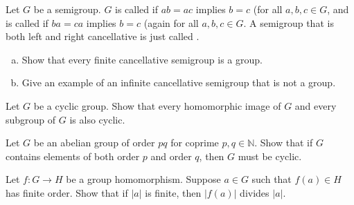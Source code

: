 \documentclass{problemset}
\begin{document}

\begin{exercise}
Let \(G\) be a semigroup. \(G\) is called  if \(ab=ac\) implies \(b=c\) (for all \(a,b,c \in G\), and is called  if \(ba=ca\) implies \(b=c\) (again for all \(a,b,c \in G\).  A semigroup that is both left and right cancellative is just called . 
\begin{enumerate}[(a)]
\item Show that every finite cancellative semigroup is a group.
\item Give an example of an infinite cancellative semigroup that is not a group.
\end{enumerate}
\end{exercise}


\begin{exercise}
Let \(G\) be a cyclic group. Show that every homomorphic image of \(G\) and every subgroup of \(G\) is also cyclic.
\end{exercise}


\begin{exercise}
Let \(G\) be an abelian group of order \(pq\) for coprime \(p,q\in \mathbb{N}\).  Show that if \(G\) contains elements of both order \(p\) and order \(q\), then \(G\) must be cyclic.
\end{exercise}


\begin{exercise}
Let \(f:G \rightarrow H\) be a group homomorphism.  Suppose \(a\in G\) such that \(f(a) \in H\) has finite order.  Show that if \(|a|\) is finite,  then \(|f(a)|\) divides \( |a|\).
\end{exercise}

\end{document}
